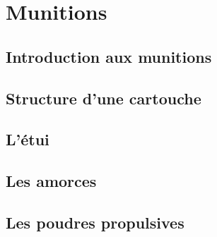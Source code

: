 
\chapter*{}

\cleardoublepage
{}
\renewcommand{\CurrentPartColor}{Part5Color}
\renewcommand{\CurrentPartNumber}{Partie 05}
\renewcommand{\CurrentPartName}{Les Munitions}
\renewcommand{\CurrentChapterType}{Chapitre}


\part{Munitions}

    \chapter{Introduction aux munitions}
    \label{chap:introduction_munitions}
    

    \chapter{Structure d'une cartouche}
    \label{chap:structure_cartouche}
    

    \chapter{L'étui}
    \label{chap:etui}
    

    \chapter{Les amorces}
    \label{chap:amorces}
    

    \chapter{Les poudres propulsives}
    \label{chap:poudres_propulsives}
    

